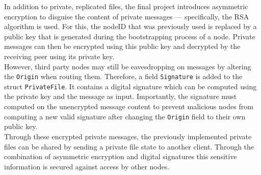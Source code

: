 \documentclass{article}
\begin{document}
 In addition to private, replicated files, the final project introduces asymmetric encryption to disguise the content of private messages --- specifically, the RSA algorithm is used. 
For this, the nodeID that was previously used is replaced by a public key that is generated during the bootstrapping process of a node. Private messages can then be encrypted using this public key and decrypted by the receiving peer using its private key.
\\
However, third party nodes may still be eavesdropping on messages by altering the \texttt{Origin} when routing them. Therefore, a field \texttt{Signature} is added to the struct \texttt{PrivateFile}. It contains a digital signature which can be computed using the private key and the message as input. Importantly, the signature must computed on the unencrypted message content to prevent malicious nodes from computing a new valid signature after changing the \texttt{Origin} field to their own public key. 
\\
Through these encrypted private messages, the previously implemented private files can be shared by sending a private file state to another client. Through the combination of asymmetric encryption and digital signatures this sensitive information is secured against access by other nodes. 

\pagebreak

\end{document}
